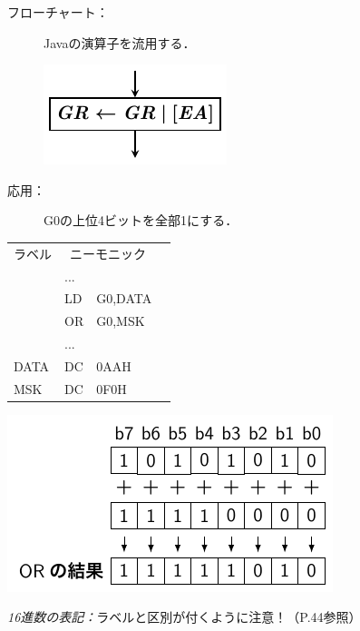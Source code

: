 \documentclass{beamer}                 %
\begin{document}
\begin{frame}
  \begin{description}
  \item[フローチャート：] Javaの演算子を流用する．\\
  \vfill
    \centerline{\includegraphics[scale=0.7]{../Tikz/or_chap5.pdf}}
  \vfill
  \item[応用：] G0の上位4ビットを全部1にする．
  \end{description}
  \vfill
  \begin{minipage}{0.48\columnwidth}
    {\ttfamily\small\begin{center}
      \begin{tabular}{|l|l l|l}
        \cline{1-3}
        ラベル & \multicolumn{2}{|c|}{ニーモニック} & \\
        \cline{1-3}
        & ...  &        & \\
        & LD   & G0,DATA& \\
        & OR   & G0,MSK & \\
        & ...  &        & \\
        DATA& DC   & 0AAH    & \\
        MSK & DC   & 0F0H    & \\
        \cline{1-3}
      \end{tabular}
    \end{center}}
  \end{minipage}
  \begin{minipage}{0.48\columnwidth}
    \centerline{\includegraphics[scale=0.8]{../Tikz/lor.pdf}}
  \end{minipage}
  \vfill
  \emph{16進数の表記：}ラベルと区別が付くように注意！（P.44参照）
  \vfill
\end{frame}
\end{document}
